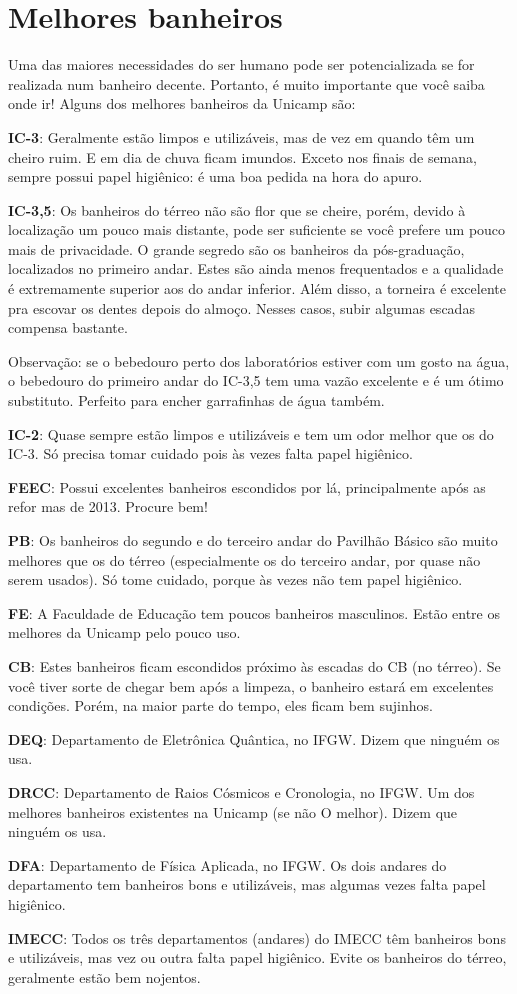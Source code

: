 \section{Melhores banheiros}

Uma das maiores necessidades do ser humano pode ser potencializada se for realizada num banheiro decente. Portanto, é muito importante que você saiba onde ir!  Alguns dos melhores banheiros da Unicamp são:

\textbf{IC-3}: Geralmente estão limpos e utilizáveis, mas de vez em quando têm um cheiro  ruim. E em dia de chuva ficam imundos. Exceto nos finais de semana, sempre possui  papel higiênico: é uma boa pedida na hora do apuro.

\textbf{IC-3,5}: Os banheiros do térreo não são flor que se cheire, porém, devido à localização  um pouco mais distante, pode ser suficiente se você prefere um pouco mais de  privacidade. O grande segredo são os banheiros da pós-graduação, localizados no  primeiro andar. Estes são ainda menos frequentados e a qualidade é extremamente  superior aos do andar inferior. Além disso, a torneira é excelente pra escovar os dentes  depois do almoço. Nesses casos, subir algumas escadas compensa bastante.

Observação: se o bebedouro perto dos laboratórios estiver com um gosto na água, o  bebedouro do primeiro andar do IC-3,5 tem uma vazão excelente e é um ótimo  substituto. Perfeito para encher garrafinhas de água também.

\textbf{IC-2}: Quase sempre estão limpos e utilizáveis e tem um odor melhor que os do IC-3.  Só precisa tomar cuidado pois às vezes falta papel higiênico.

\textbf{FEEC}: Possui excelentes banheiros escondidos por lá, principalmente após as refor mas de 2013. Procure bem! 

\textbf{PB}: Os banheiros do segundo e do terceiro andar do Pavilhão Básico são muito  melhores que os do térreo (especialmente os do terceiro andar, por quase não serem  usados). Só tome cuidado, porque às vezes não tem papel higiênico. 

\textbf{FE}: A Faculdade de Educação tem poucos banheiros masculinos. Estão entre os  melhores da Unicamp pelo pouco uso. 

\textbf{CB}: Estes banheiros ficam escondidos próximo às escadas do CB (no térreo). Se você  tiver sorte de chegar bem após a limpeza, o banheiro estará em excelentes condições.  Porém, na maior parte do tempo, eles ficam bem sujinhos. 

\textbf{DEQ}: Departamento de Eletrônica Quântica, no IFGW. Dizem que ninguém os usa. 

\textbf{DRCC}: Departamento de Raios Cósmicos e Cronologia, no IFGW. Um dos melhores  banheiros existentes na Unicamp (se não O melhor). Dizem que ninguém os usa. 

\textbf{DFA}: Departamento de Física Aplicada, no IFGW. Os dois andares do departamento  tem banheiros bons e utilizáveis, mas algumas vezes falta papel higiênico. 

\textbf{IMECC}: Todos os três departamentos (andares) do IMECC têm banheiros bons e  utilizáveis, mas vez ou outra falta papel higiênico. Evite os banheiros do térreo,  geralmente estão bem nojentos.
